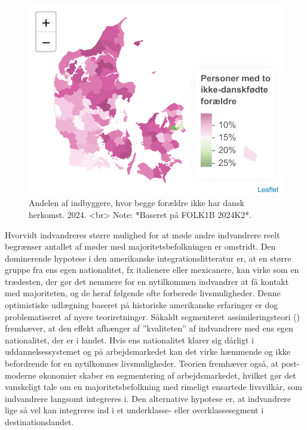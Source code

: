 \documentclass[
]{book}
\begin{document}
\begin{figure}
\includegraphics[width=1\linewidth]{en-befolkning-blander-sig_files/figure-latex/fig-1-22-1} \caption{Andelen af indbyggere, hvor begge forældre ikke har dansk herkomst. 2024. <br> Note: *Baseret på FOLK1B 2024K2*.}\label{fig:fig-1-22}
\end{figure}

Hvorvidt indvandreres større mulighed for at møde andre indvandrere reelt begrænser antallet af møder med majoritetsbefolkningen er omstridt. Den dominerende hypotese i den amerikanske integrationslitteratur er, at en større gruppe fra ens egen nationalitet, fx italienere eller mexicanere, kan virke som en trædesten, der gør det nemmere for en nytilkommen indvandrer at få kontakt med majoriteten, og de heraf følgende ofte forberede livsmuligheder. Denne optimistiske udlægning baseret på historiske amerikanske erfaringer er dog problematiseret af nyere teoriretninger. Såkaldt segmenteret assimileringsteori () fremhæver, at den effekt afhænger af ''kvaliteten'' af indvandrere med ens egen nationalitet, der er i landet. Hvis ens nationalitet klarer sig dårligt i uddannelsessystemet og på arbejdsmarkedet kan det virke hæmmende og ikke befordrende for en nytilkomnes livsmuligheder. Teorien fremhæver også, at post-moderne økonomier skaber en segmentering af arbejdsmarkedet, hvilket gør det vanskeligt tale om en majoritetsbefolkning med rimeligt ensartede livsvilkår, som indvandrere langsomt integreres i. Den alternative hypotese er, at indvandrere lige så vel kan integreres ind i et underklasse- eller overklassesegment i destinationslandet.
\end{document}
